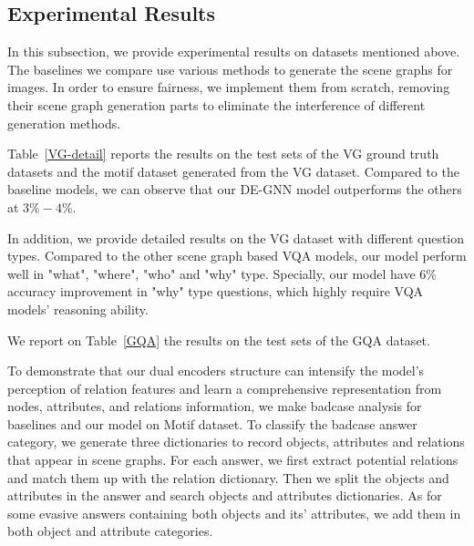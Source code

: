 \documentclass[letterpaper]{article} %
\begin{document}
\subsection{Experimental Results}
In this subsection, we provide experimental results on datasets mentioned above. 
The baselines we compare use various methods to generate the scene graphs for images. 
In order to ensure fairness, we implement them from scratch, removing their scene graph generation parts to eliminate the interference of different generation methods.

Table~\ref{VG-detail} reports the results on the test sets of the VG ground truth datasets and the motif dataset generated from the VG dataset. Compared to the baseline models, we can observe that our DE-GNN model outperforms the others at $3\% - 4\%$. 

In addition, we provide detailed results on the VG dataset with different question types. Compared to the other scene graph based VQA models, our model perform well in "what", "where", "who" and "why" type. Specially, our model have $6\%$ accuracy improvement in "why" type questions, which highly require VQA models' reasoning ability.


We report on Table~\ref{GQA} the results on the test sets of the GQA dataset.

To demonstrate that our dual encoders structure can intensify the model's perception of relation features and learn a comprehensive representation from nodes, attributes, and relations information, we make badcase analysis for baselines and our model on Motif dataset. To classify the badcase answer category, we generate three dictionaries to record objects, attributes and relations that appear in scene graphs. For each answer, we first extract potential relations and match them up with the relation dictionary. Then we split the objects and attributes in the answer and search objects and attributes dictionaries. As for some evasive answers containing both objects and its' attributes, we add them in both object and attribute categories. 
\end{document}
